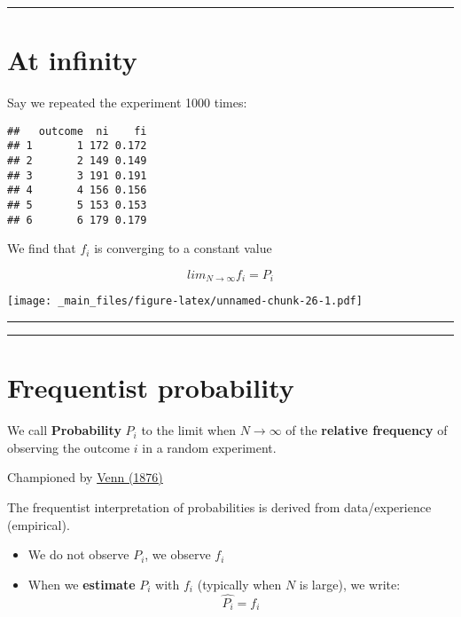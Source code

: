 \documentclass[
]{book}
\providecommand{\tightlist}{%
  \setlength{\itemsep}{0pt}\setlength{\parskip}{0pt}}
\begin{document}
\begin{center}\rule{0.5\linewidth}{0.5pt}\end{center}

\hypertarget{at-infinity}{%
\section{At infinity}\label{at-infinity}}

Say we repeated the experiment 1000 times:

\begin{verbatim}
##   outcome  ni    fi
## 1       1 172 0.172
## 2       2 149 0.149
## 3       3 191 0.191
## 4       4 156 0.156
## 5       5 153 0.153
## 6       6 179 0.179
\end{verbatim}

We find that \(f_i\) is converging to a constant value

\[lim_{N\rightarrow \infty} f_i = P_i\]

\texttt{[image: \_main\_files/figure-latex/unnamed-chunk-26-1.pdf]}

\begin{center}\rule{0.5\linewidth}{0.5pt}\end{center}

\begin{center}\rule{0.5\linewidth}{0.5pt}\end{center}

\hypertarget{frequentist-probability}{%
\section{Frequentist probability}\label{frequentist-probability}}

We call \textbf{Probability} \(P_i\) to the limit when \(N \rightarrow \infty\) of the \textbf{relative frequency} of observing the outcome \(i\) in a random experiment.

Championed by \href{https://plato.stanford.edu/entries/probability-interpret/\#ClaPro}{Venn (1876)}

The frequentist interpretation of probabilities is derived from data/experience (empirical).

\begin{itemize}
\tightlist
\item
  We do not observe \(P_i\), we observe \(f_i\)
\item
  When we \textbf{estimate} \(P_i\) with \(f_i\) (typically when \(N\) is large), we write: \[\hat{P_i}=f_i\]
\end{itemize}
\end{document}
